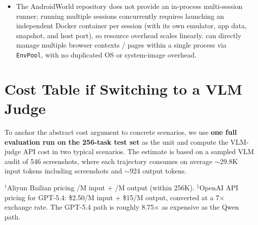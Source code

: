 \begin{itemize}
  \item The AndroidWorld repository does not provide an in-process multi-session runner; running multiple sessions concurrently requires launching an independent Docker container per session (with its own emulator, app data, snapshot, and host port), so resource overhead scales linearly. \sys{} can directly manage multiple browser contexts / pages within a single process via \texttt{EnvPool}, with no duplicated OS or system-image overhead.
\end{itemize}


\section{Cost Table if Switching to a VLM Judge}\label{app:cost}

To anchor the abstract cost argument to concrete scenarios, we use \textbf{one full evaluation run on the 256-task \sys{} test set} as the unit and compute the VLM-judge API cost in two typical scenarios. The estimate is based on a sampled VLM audit of 546 screenshots, where each trajectory consumes on average $\sim$29.8K input tokens including screenshots and $\sim$924 output tokens.

\begin{table}[!htbp]
  \centering\small
  \setlength{\tabcolsep}{3pt}
  \caption{Per-run cost comparison if a VLM judge were used}
  \label{tab:cost-actual}
\end{table}

$^\dagger$Aliyun Bailian pricing /M input + /M output (within 256K). $^\ddagger$OpenAI API pricing for GPT-5.4: \$2.50/M input + \$15/M output, converted at a 7$\times$ exchange rate. The GPT-5.4 path is roughly 8.75$\times$ as expensive as the Qwen path.

